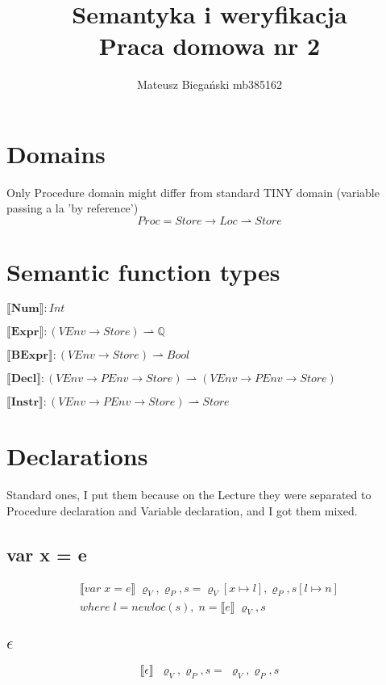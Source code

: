 \documentclass[12pt]{article}
\title{Semantyka i weryfikacja \\ Praca domowa nr 2}
\author{Mateusz Biegański mb385162}
\newcommand{\sem}[1]{\llbracket #1 \rrbracket}
\newcommand{\srod}{\;\varrho_{V}, s}
\newcommand{\srodP}{\;\varrho_{V}, \varrho_{P}, s}
\newcommand{\eq}[2]{\subsection*{#1} \begin{gather*} #2 \end{gather*}}
\begin{document}
\maketitle

\section*{Domains}
Only Procedure domain might differ from standard TINY domain (variable passing  a la 'by reference')
$$Proc = Store \rightarrow Loc \rightharpoonup Store$$

\section*{Semantic function types}

$\sem{\mathbf{Num}} : Int$

$\sem{\mathbf{Expr}}: (VEnv \rightarrow Store) \rightharpoonup \mathbb{Q}$

$\sem{\mathbf{BExpr}} : (VEnv \rightarrow Store) \rightharpoonup Bool$

$\sem{\mathbf{Decl}} : (VEnv \rightarrow PEnv \rightarrow Store) \rightharpoonup (VEnv \rightarrow PEnv \rightarrow Store)$

$\sem{\mathbf{Instr}} : (VEnv \rightarrow PEnv \rightarrow Store) \rightharpoonup Store$


\section*{Declarations}

Standard ones, I put them because on the Lecture they were separated to Procedure declaration and Variable declaration, and I got them mixed.

\eq {var x = e} {
	\sem{var \; x = e} \srodP = \varrho_{V}[x \mapsto l], \varrho_{P}, 
	s[l \mapsto n] \\
	where \; l = newloc(s), \; n = \sem{e} \srod
}

\eq {$\epsilon$} {
	\sem{\epsilon} \; \srodP = \srodP%
}
\end{document}
